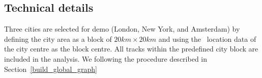 \subsection{Technical details}

Three cities are selected for demo (London, New York, and Amsterdam) by defining the city area as a block of $20km\times20km$ and using the \gps\ location data of the city centre as the block centre.
All tracks within the predefined city block are included in the analysis.
We following the procedure described in Section~\ref{build_global_graph}










